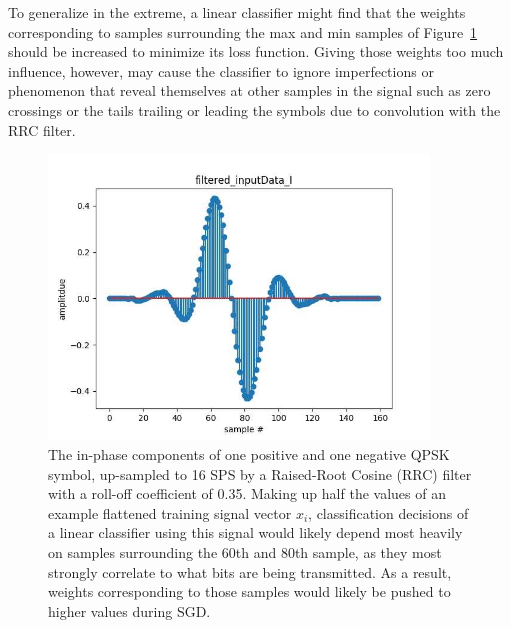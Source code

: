 To generalize in the extreme, a linear classifier might find that the weights corresponding to samples surrounding the max and min samples of Figure~\ref{fig:rrc} should be increased to minimize its loss function. Giving those weights too much influence, however, may cause the classifier to ignore imperfections or phenomenon that reveal themselves at other samples in the signal such as zero crossings or the tails trailing or leading the symbols due to convolution with the RRC filter.

\begin{figure}[ht!]
	\centering \includegraphics[width=0.9\textwidth,keepaspectratio]{figs/RRC.jpeg}
    \caption{The in-phase components of one positive and one negative QPSK symbol, up-sampled to 16 SPS by a Raised-Root Cosine (RRC) filter with a roll-off coefficient of 0.35. Making up half the values of an example flattened training signal vector $x_i$, classification decisions of a linear classifier using this signal would likely depend most heavily on samples surrounding the 60th and 80th sample, as they most strongly correlate to what bits are being transmitted. As a result, weights corresponding to those samples would likely be pushed to higher values during SGD.}
\label{fig:rrc}
\end{figure}

